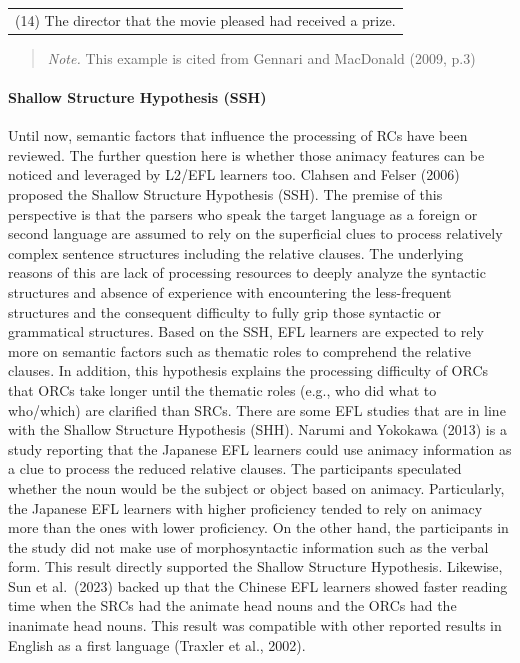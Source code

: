 \documentclass[
]{article}
\begin{document}
\vspace{1em}
\setlength{\parindent}{0pt}
\noindent
\begin{tabular}[t]{@{}p{\linewidth}@{}}
(14) The director that the movie pleased had received a prize. \\
\end{tabular}

\vspace{1em}

\noindent
\begin{quote}
\small
\textit{Note.} This example is cited from Gennari and MacDonald (2009, p.3)
\end{quote}

\vspace{1em}

\paragraph{Shallow Structure Hypothesis
(SSH)}\label{shallow-structure-hypothesis-ssh}

Until now, semantic factors that influence the processing of RCs have
been reviewed. The further question here is whether those animacy
features can be noticed and leveraged by L2/EFL learners too. Clahsen
and Felser (2006) proposed the Shallow Structure Hypothesis (SSH). The
premise of this perspective is that the parsers who speak the target
language as a foreign or second language are assumed to rely on the
superficial clues to process relatively complex sentence structures
including the relative clauses. The underlying reasons of this are lack
of processing resources to deeply analyze the syntactic structures and
absence of experience with encountering the less-frequent structures and
the consequent difficulty to fully grip those syntactic or grammatical
structures. Based on the SSH, EFL learners are expected to rely more on
semantic factors such as thematic roles to comprehend the relative
clauses. In addition, this hypothesis explains the processing difficulty
of ORCs that ORCs take longer until the thematic roles (e.g., who did
what to who/which) are clarified than SRCs. There are some EFL studies
that are in line with the Shallow Structure Hypothesis (SHH). Narumi and
Yokokawa (2013) is a study reporting that the Japanese EFL learners
could use animacy information as a clue to process the reduced relative
clauses. The participants speculated whether the noun would be the
subject or object based on animacy. Particularly, the Japanese EFL
learners with higher proficiency tended to rely on animacy more than the
ones with lower proficiency. On the other hand, the participants in the
study did not make use of morphosyntactic information such as the verbal
form. This result directly supported the Shallow Structure Hypothesis.
Likewise, Sun et al.~(2023) backed up that the Chinese EFL learners
showed faster reading time when the SRCs had the animate head nouns and
the ORCs had the inanimate head nouns. This result was compatible with
other reported results in English as a first language (Traxler et al.,
2002).
\end{document}
